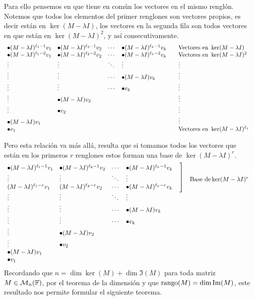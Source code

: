 Para ello pensemos en que tiene en común los vectores en el mismo renglón. Notemos que todos los elementos del primer renglones son vectores propios, es decir están en $\ker(M-\lambda I)$, los vectores en la segunda fila son todos vectores en que están en $\ker(M-\lambda I)^2$, y así consecutivamente.
\[
  \begin{array}{llll@{\qquad}l} 
    \bullet (M-\lambda I)^{\ell_1-1}v_1 & \bullet (M-\lambda I)^{\ell_2-1}v_2 & \cdots & \bullet (M-\lambda I)^{\ell_k-1}v_k  & \text{Vectores en } \ker(M-\lambda I)\\
    \bullet (M-\lambda I)^{\ell_1-2}v_1 & \bullet (M-\lambda I)^{\ell_2-2}v_2 & \cdots & \bullet (M-\lambda I)^{\ell_k-2}v_k  & \text{Vectores en } \ker(M-\lambda I)^2 \\
    \vdots & \vdots & \ddots & \vdots & \vdots \\
    \vdots & \vdots & \cdots & \bullet (M-\lambda I)v_k  & \vdots  \\
    \vdots & \vdots & \cdots & \bullet v_k  & \vdots  \\
    \vdots & \bullet (M-\lambda I)v_2  & & & \vdots \\
    \vdots & \bullet v_2  & &  & \vdots \\
    \bullet (M-\lambda I)v_1 & & & & \vdots \\
    \bullet v_1 & & & & \text{Vectores en } \ker(M-\lambda I)^{\ell_1}\\
  \end{array}
\]

Pero esta relación va más allá, resulta que si tomamos todos los vectores que están en los primeros $r$ renglones estos forman una base de $\ker(M-\lambda I)^r$.
\[
  \begin{array}{llll@{\quad}l} 
    \bullet (M-\lambda I)^{\ell_1-1}v_1 & \bullet (M-\lambda I)^{\ell_2-1}v_2 & \cdots & \bullet (M-\lambda I)^{\ell_k-1}v_k  & \\
    \vdots & \vdots & \ddots & \vdots &
        \raisebox{0.35em}{\smash{$\left.\rule{0pt}{1cm}\right]$}} \quad\text{Base de} \ker(M-\lambda I)^r\\
    (M-\lambda I)^{\ell_1-r}v_1 & (M-\lambda I)^{\ell_2-r}v_2 & \cdots & \bullet (M-\lambda I)^{\ell_k-r}v_k  &   \\
    \vdots & \vdots & \ddots & \vdots &  \\
    \vdots & \vdots & \cdots & \bullet (M-\lambda I)v_k  &   \\
    \vdots & \vdots & \cdots & \bullet v_k  &   \\
    \vdots & \bullet (M-\lambda I)v_2  & & &  \\
    \vdots & \bullet v_2  & &  &  \\
    \bullet (M-\lambda I)v_1 & & & &  \\
    \bullet v_1 & & & & \\
  \end{array}
\]
Recordando que $n = \dim\ker(M) + \dim\Im(M)$ para toda matriz $M \in \mathcal{M}_n(\mathbb{F})$, por el teorema de la dimensión y que $\operatorname{rango}(M) = \dim \operatorname{Im}(M)$, este resultado nos permite formular el siguiente teorema.

